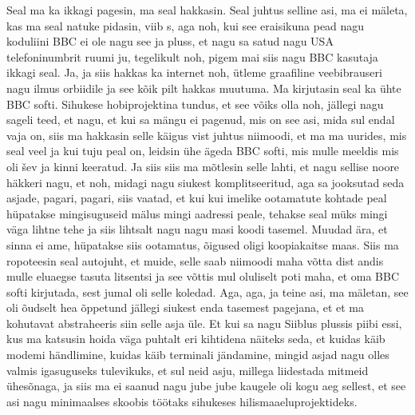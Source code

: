Seal ma ka ikkagi pagesin, ma seal hakkasin. Seal juhtus selline asi, ma ei mäleta, kas ma seal natuke pidasin, viib s, aga noh, kui see eraisikuna pead nagu koduliini BBC ei ole nagu see ja pluss, et nagu sa satud nagu USA telefoninumbrit ruumi ju, tegelikult noh, pigem mai siis nagu BBC kasutaja ikkagi seal. Ja, ja siis hakkas ka internet noh, ütleme graafiline veebibrauseri nagu ilmus orbiidile ja see kõik pilt hakkas muutuma. Ma kirjutasin seal ka ühte BBC softi. Sihukese hobiprojektina tundus, et see võiks olla noh, jällegi nagu sageli teed, et nagu, et kui sa mängu ei pagenud, mis on see asi, mida sul endal vaja on, siis ma hakkasin selle käigus vist juhtus niimoodi, et ma ma uurides, mis seal veel ja kui tuju peal on, leidsin ühe ägeda BBC softi, mis mulle meeldis mis oli šev ja kinni keeratud. Ja siis siis ma mõtlesin selle lahti, et nagu sellise noore häkkeri nagu, et noh, midagi nagu siukest komplitseeritud, aga sa jooksutad seda asjade, pagari, pagari, siis vaatad, et kui kui imelike ootamatute kohtade peal hüpatakse mingisuguseid mälus mingi aadressi peale, tehakse seal müks mingi väga lihtne tehe ja siis lihtsalt nagu nagu masi koodi tasemel. Muudad ära, et sinna ei ame, hüpatakse siis ootamatus, õigused oligi koopiakaitse maas. Siis ma ropoteesin seal autojuht, et muide, selle saab niimoodi maha võtta dist andis mulle eluaegse tasuta litsentsi ja see võttis mul oluliselt poti maha, et oma BBC softi kirjutada, sest jumal oli selle koledad. Aga, aga, ja teine asi, ma mäletan, see oli õudselt hea õppetund jällegi siukest enda tasemest pagejana, et et ma kohutavat abstraheeris siin selle asja üle. Et kui sa nagu Siiblus plussis piibi essi, kus ma katsusin hoida väga puhtalt eri kihtidena näiteks seda, et kuidas käib modemi händlimine, kuidas käib terminali jändamine, mingid asjad nagu olles valmis igasuguseks tulevikuks, et sul neid asju, millega liidestada mitmeid ühesõnaga, ja siis ma ei saanud nagu jube jube kaugele oli kogu aeg sellest, et see asi nagu minimaalses skoobis töötaks sihukeses hilismaaeluprojektideks.

